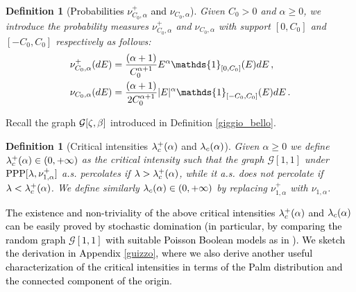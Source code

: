 \documentclass[12pt,a4paper,reqno]{amsart}
\newtheorem{Definition}[Theorem]{Definition}
\newcommand{\cG}{\ensuremath{\mathcal G}}
\let\a=\alpha \let\b=\beta   \let\d=\delta  \let\e=\varepsilon
\newcommand{\rosso}{\textcolor{black}} %
\begin{document}
\begin{Definition}[\rosso{Probabilities $\nu^+ _{C_0,\a}$ and $\nu_{C_0,\a}$}]\label{almograve}
Given   $C_0>0$ and $\a\geq 0$, we introduce the probability measures $\nu^+ _{C_0,\a}$ and $\nu_{C_0,\a}$ with support $[0,C_0]$ and $[-C_0,C_0]$ respectively as follows:
  \begin{align}
&\nu^+ _{C_0,\a}(dE)=\frac{(\a+1)}{  C_0 ^{\a+1} }  E^\a \rosso{\mathds{1}_{[0,C_0]}(E)}  dE\,,\label{speciale2}\\
&\nu_{C_0,\a} (dE)=\frac{(\a+1)}{ 2 C_0 ^{\a+1} }  |E|^\a  \rosso{\mathds{1}_{[-C_0,C_0]}(E)}   dE\,.\label{speciale1}
\end{align}
\end{Definition}
Recall the graph $\cG[\z,\b]$ introduced in Definition \ref{giggio_bello}.  
\begin{Definition}[Critical intensities $\l^+_c(\a)$ and $\l_c(\a)$]
\label{fiordo} Given $\a\geq 0$ we  define $\l^+_c(\a) \in(0,+\infty)$  as the critical intensity such that   the graph $\cG[1, 1]$ under ${\rm PPP}[\l,\nu^+_{1,\a}] $ a.s. percolates  if $\l >\l^+_c(\a)$, while  it 
a.s.   does not percolate if $\l<\l^+_c(\a)$.
We define  similarly  $\l _c(\a)\in(0,+\infty)$  by replacing  $\nu^+_{1,\a}$ with $\nu_{1,\a}$.
  \end{Definition}
\rosso{The existence and non-triviality of the above critical intensities  $\l^+_c(\a)$ and  $\l_c(\a)$ can be easily proved by stochastic domination (in particular,  by comparing the random graph $\cG[1,1]$ with suitable  Poisson Boolean models as in  \cite{FagMim1,FagMim2}).  We sketch the derivation in   Appendix \ref{guizzo}, where we also derive another useful characterization of the critical intensities in terms of the Palm distribution and the connected component of the origin}.
\end{document}
